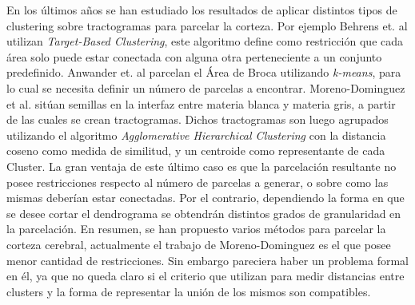 En los \'ultimos a\~nos se han estudiado los resultados de aplicar distintos 
tipos de clustering sobre tractogramas para parcelar la corteza.  Por
ejemplo Behrens et. al \cite{Behrens2003} utilizan \textit{Target-Based Clustering},
este algoritmo define como restricci\'on que cada \'area solo puede estar
conectada con alguna otra perteneciente a un conjunto predefinido. Anwander et.
al \cite{Anwander2006} parcelan el \'Area de Broca utilizando \textit{k-means},
para lo cual se necesita definir un n\'umero de parcelas a encontrar. 
Moreno-Dominguez et al. \cite{Moreno-Dominguez2014} sit\'uan semillas en la
interfaz entre materia blanca y materia gris, a partir de las cuales se crean
tractogramas. Dichos tractogramas son luego agrupados utilizando el algoritmo
\textit{Agglomerative Hierarchical Clustering} con la distancia coseno como
medida de similitud, y un centroide como representante de cada Cluster. La gran
ventaja de este \'ultimo caso es que la parcelaci\'on resultante no posee
restricciones respecto al n\'umero de parcelas a generar, o sobre como las mismas 
deber\'ian estar conectadas. Por el contrario, dependiendo la forma en que se
desee cortar el dendrograma se obtendr\'an distintos grados de granularidad en
la parcelaci\'on. En resumen, se han propuesto varios m\'etodos para parcelar la
corteza cerebral, actualmente el trabajo de Moreno-Dominguez es el que posee menor 
cantidad de restricciones. Sin embargo pareciera haber un problema formal en \'el,
ya que no queda claro si el criterio que utilizan para medir distancias entre
clusters y la forma de representar la uni\'on de los mismos son compatibles. \\

